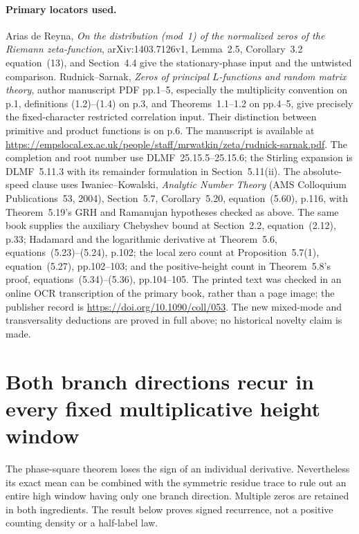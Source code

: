 \paragraph{Primary locators used.}
Arias de Reyna, \emph{On the distribution (mod~1) of the normalized
zeros of the Riemann zeta-function}, arXiv:1403.7126v1,
Lemma~2.5, Corollary~3.2 equation~(13), and Section~4.4 give the
stationary-phase input and the untwisted comparison.
Rudnick--Sarnak, \emph{Zeros of principal $L$-functions and random
matrix theory}, author manuscript PDF pp.1--5, especially the
multiplicity convention on p.1, definitions (1.2)--(1.4) on p.3,
and Theorems~1.1--1.2 on pp.4--5, give precisely the fixed-character
restricted correlation input. Their distinction between primitive
and product functions is on p.6. The manuscript is available at
\url{https://empslocal.ex.ac.uk/people/staff/mrwatkin/zeta/rudnick-sarnak.pdf}.
The completion and root number use DLMF~25.15.5--25.15.6; the
Stirling expansion is DLMF~5.11.3 with its remainder formulation
in Section~5.11(ii). The absolute-speed clause uses
Iwaniec--Kowalski, \emph{Analytic Number Theory} (AMS Colloquium
Publications~53, 2004), Section~5.7, Corollary~5.20, equation~(5.60),
p.116, with Theorem~5.19's GRH and Ramanujan hypotheses checked
as above. The same book supplies the auxiliary Chebyshev bound at
Section~2.2, equation~(2.12), p.33; Hadamard and the logarithmic
derivative at Theorem~5.6, equations~(5.23)--(5.24), p.102; the
local zero count at Proposition~5.7(1), equation~(5.27), pp.102--103;
and the positive-height count in Theorem~5.8's proof,
equations~(5.34)--(5.36), pp.104--105.
The printed text was checked in an online OCR transcription
of the primary book, rather than a page image; the publisher record
is \url{https://doi.org/10.1090/coll/053}.
The new mixed-mode and transversality deductions
are proved in full above; no historical novelty claim is made.


\section{Both branch directions recur in every fixed multiplicative height window}
\label{sec:analytic-signed-recurrence}

The phase-square theorem loses the sign of an individual derivative.
Nevertheless its exact mean can be combined with the symmetric
residue trace to rule out an entire high window having only one
branch direction. Multiple zeros are retained in both ingredients.
The result below proves signed recurrence, not a positive counting
density or a half-label law.

